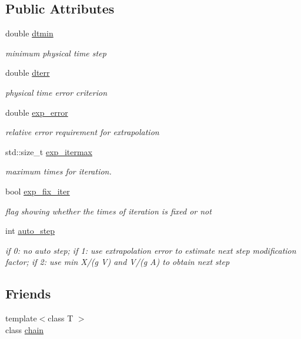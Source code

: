 \subsection*{Public Attributes}
\begin{DoxyCompactItemize}
\item 
double \hyperlink{classARC_1_1chainpars_ac414014d19915aecb35245ba11649c2e}{dtmin}
\begin{DoxyCompactList}\small\item\em minimum physical time step \end{DoxyCompactList}\item 
double \hyperlink{classARC_1_1chainpars_ad3a3e8f9199180ec82b9c257b1e8570e}{dterr}
\begin{DoxyCompactList}\small\item\em physical time error criterion \end{DoxyCompactList}\item 
double \hyperlink{classARC_1_1chainpars_a7ee477ebe8b1d67457891ab58560c074}{exp\+\_\+error}
\begin{DoxyCompactList}\small\item\em relative error requirement for extrapolation \end{DoxyCompactList}\item 
std\+::size\+\_\+t \hyperlink{classARC_1_1chainpars_a91a648cc6e52054cecad54a29dc5e9a1}{exp\+\_\+itermax}
\begin{DoxyCompactList}\small\item\em maximum times for iteration. \end{DoxyCompactList}\item 
bool \hyperlink{classARC_1_1chainpars_a3f16e6ea9497e294265c4a17df0394ba}{exp\+\_\+fix\+\_\+iter}
\begin{DoxyCompactList}\small\item\em flag showing whether the times of iteration is fixed or not \end{DoxyCompactList}\item 
int \hyperlink{classARC_1_1chainpars_a9fc7b9a8ce26c24cf95f53bdc80924c7}{auto\+\_\+step}
\begin{DoxyCompactList}\small\item\em if 0\+: no auto step; if 1\+: use extrapolation error to estimate next step modification factor; if 2\+: use min X/(g V) and V/(g A) to obtain next step \end{DoxyCompactList}\end{DoxyCompactItemize}
\subsection*{Friends}
\begin{DoxyCompactItemize}
\item 
{\footnotesize template$<$class T $>$ }\\class \hyperlink{classARC_1_1chainpars_a498fbb4337b9878a5f0044996e4a2489}{chain}
\end{DoxyCompactItemize}



